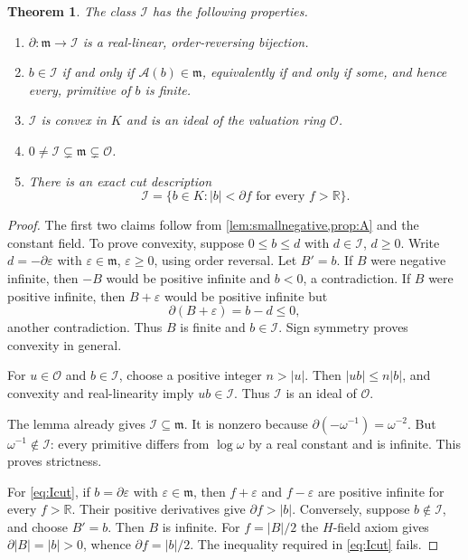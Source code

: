 \documentclass[11pt]{article}
\numberwithin{equation}{section}
\newtheorem{theorem}{Theorem}[section]
\theoremstyle{definition}
\newcommand{\R}{\mathbb R}
\newcommand{\OO}{\mathcal O}
\newcommand{\mm}{\mathfrak m}
\newcommand{\II}{\mathcal I}
\newcommand{\DD}{\partial}
\newcommand{\Prim}{\mathcal A}
\begin{document}
\begin{theorem}\label{thm:I}
The class $\II$ has the following properties.
\begin{enumerate}[label=(\roman*),itemsep=2pt]
\item $\DD:\mm\to\II$ is a real-linear, order-reversing bijection.
\item $b\in\II$ if and only if $\Prim(b)\in\mm$, equivalently if and only if
some, and hence every, primitive of $b$ is finite.
\item $\II$ is convex in $K$ and is an ideal of the valuation ring $\OO$.
\item $0\ne\II\subsetneq\mm\subsetneq\OO$.
\item There is an exact cut description
\begin{equation}\label{eq:Icut}
 \II=\{b\in K: |b|<\DD f\text{ for every }f>\R\}.
\end{equation}
\end{enumerate}
\end{theorem}
\begin{proof}
The first two claims follow from \cref{lem:smallnegative,prop:A} and the
constant field. To prove convexity, suppose $0\le b\le d$ with
$d\in\II$, $d\ge0$. Write $d=-\DD\varepsilon$ with
$\varepsilon\in\mm$, $\varepsilon\ge0$, using order reversal. Let
$B'=b$. If $B$ were negative infinite, then $-B$ would be positive infinite
and $b<0$, a contradiction. If $B$ were positive infinite, then
$B+\varepsilon$ would be positive infinite but
\[
 \DD(B+\varepsilon)=b-d\le0,
\]
another contradiction. Thus $B$ is finite and $b\in\II$. Sign symmetry
proves convexity in general.

For $u\in\OO$ and $b\in\II$, choose a positive integer $n>|u|$.
Then $|ub|\le n|b|$, and convexity and real-linearity imply
$ub\in\II$. Thus $\II$ is an ideal of $\OO$.

The lemma already gives $\II\subseteq\mm$. It is nonzero because
$\DD(-\omega^{-1})=\omega^{-2}$. But $\omega^{-1}\notin\II$:
every primitive differs from $\log\omega$ by a real constant and is
infinite. This proves strictness.

For \eqref{eq:Icut}, if $b=\DD\varepsilon$ with
$\varepsilon\in\mm$, then $f+\varepsilon$ and $f-\varepsilon$ are
positive infinite for every $f>\R$. Their positive derivatives give
$\DD f>|b|$. Conversely, suppose $b\notin\II$, and choose $B'=b$.
Then $B$ is infinite. For $f=|B|/2$ the $H$-field axiom gives
$\DD|B|=|b|>0$, whence $\DD f=|b|/2$. The inequality required in
\eqref{eq:Icut} fails.
\end{proof}
\end{document}
